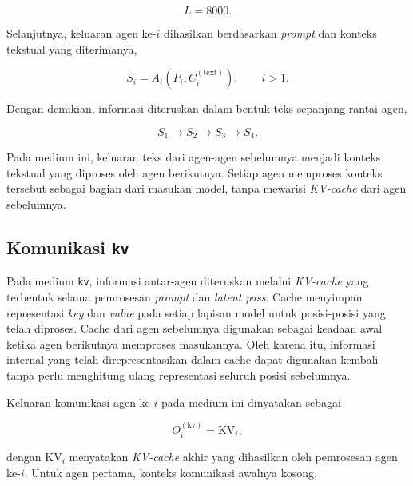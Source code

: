 \begin{equation}
    L=8000.
    \label{eq:text-context-limit}
\end{equation}

Selanjutnya, keluaran agen ke-$i$ dihasilkan berdasarkan
\textit{prompt} dan konteks tekstual yang diterimanya,

\begin{equation}
    S_i
    =
    A_i\left(P_i,C_i^{(\text{text})}\right),
    \qquad i>1.
    \label{eq:text-agent-chain}
\end{equation}

Dengan demikian, informasi diteruskan dalam bentuk teks sepanjang
rantai agen,

\begin{equation}
    S_1
    \longrightarrow
    S_2
    \longrightarrow
    S_3
    \longrightarrow
    S_4.
    \label{eq:text-communication-flow}
\end{equation}

Pada medium ini, keluaran teks dari agen-agen sebelumnya menjadi
konteks tekstual yang diproses oleh agen berikutnya. Setiap agen
memproses konteks tersebut sebagai bagian dari masukan model,
tanpa mewarisi \textit{KV-cache} dari agen sebelumnya.

\subsection{Komunikasi \texttt{kv}}

\label{subsec:komunikasi-kv}

Pada medium \texttt{kv}, informasi antar-agen diteruskan melalui
\textit{KV-cache} yang terbentuk selama pemrosesan \textit{prompt}
dan \textit{latent pass}. Cache menyimpan representasi
\textit{key} dan \textit{value} pada setiap lapisan model untuk
posisi-posisi yang telah diproses. Cache dari agen sebelumnya
digunakan sebagai keadaan awal ketika agen berikutnya memproses
masukannya. Oleh karena itu, informasi internal yang telah
direpresentasikan dalam cache dapat digunakan kembali tanpa perlu
menghitung ulang representasi seluruh posisi sebelumnya.

Keluaran komunikasi agen ke-$i$ pada medium ini dinyatakan sebagai

\begin{equation}
    O_i^{(\text{kv})}
    =
    \mathrm{KV}_i,
    \label{eq:kv-output}
\end{equation}

dengan $\mathrm{KV}_i$ menyatakan \textit{KV-cache} akhir yang
dihasilkan oleh pemrosesan agen ke-$i$. Untuk agen pertama, konteks
komunikasi awalnya kosong,

